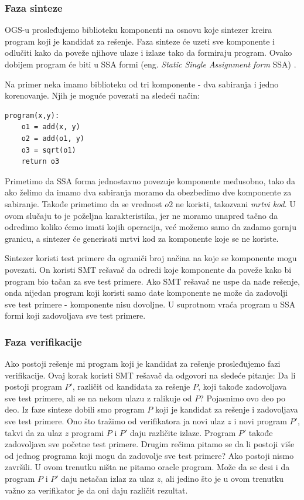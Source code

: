 \subsubsection*{Faza sinteze}

OGS-u prosleđujemo biblioteku komponenti na osnovu koje sintezer kreira program koji je kandidat za rešenje. Faza sinteze će uzeti sve komponente i odlučiti kako da poveže njihove ulaze i izlaze tako da formiraju program. Ovako dobijem program će biti u SSA formi (eng. \emph{Static Single Assignment form} SSA) \cite{SSA}.

Na primer neka imamo biblioteku od tri komponente - dva sabiranja i jedno korenovanje. Njih je moguće povezati na sledeći način:

\begin{lstlisting}
program(x,y):
	o1 = add(x, y)
	o2 = add(o1, y)
	o3 = sqrt(o1)
	return o3
\end{lstlisting}

Primetimo da SSA forma jednostavno povezuje komponente me\-đu\-so\-bno, tako da ako želimo da imamo dva sabiranja moramo da obezbedimo dve komponente za sabiranje. Takođe primetimo da se vrednost $o2$ ne koristi, takozvani \emph{mrtvi kod}. U ovom slučaju to je poželjna karakteristika, jer ne moramo unapred tačno da odredimo koliko ćemo imati kojih operacija, već možemo samo da zadamo gornju granicu, a sintezer će generisati mrtvi kod za komponente koje se ne koriste.

Sintezer koristi test primere da ograniči broj načina na koje se komponente mogu povezati. On koristi SMT rešavač da odredi koje komponente da poveže kako bi program bio tačan za sve test primere. Ako SMT rešavač ne uspe da nađe rešenje, onda nijedan program koji koristi samo date komponente ne može da zadovolji sve test primere - komponente nisu dovoljne. U suprotnom vraća program u SSA formi koji zadovoljava sve test primere.


\subsubsection*{Faza verifikacije}

Ako postoji rešenje mi program koji je kandidat za rešenje prosleđujemo fazi verifikacije. Ovaj korak koristi SMT rešavač da odgovori na sledeće pitanje: Da li postoji program $P'$, različit od kandidata za rešenje $P$, koji takođe zadovoljava sve test primere, ali se na nekom ulazu z ralikuje od $P$?
Pojasnimo ovo deo po deo. Iz faze sinteze dobili smo program $P$ koji je kandidat za rešenje i zadovoljava sve test primere. Ono što tražimo od verifikatora ja novi ulaz $z$ i novi program $P'$, takvi da za ulaz $z$ programi $P$ i $P'$ daju različite izlaze. Program $P'$ takođe zadovoljava sve početne test primere.
Drugim rečima pitamo se da li postoji više od jednog programa koji mogu da zadovolje sve test primere? Ako postoji nismo završili.
U ovom trenutku ništa ne pitamo oracle program. Može da se desi i da program $P$ i $P'$ daju netačan izlaz za ulaz $z$, ali jedino što je u ovom trenutku važno za verifikator je da oni daju različit rezultat.


